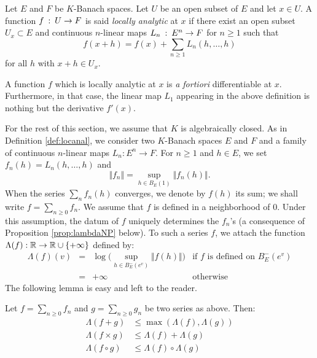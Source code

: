 \documentclass{lms}
\begin{document}
\begin{deftn}
\label{def:locanal}
Let $E$ and $F$ be $K$-Banach spaces. Let $U$ be an open subset of $E$
and let $x \in U$.
A function $f \: : \: U \rightarrow F$ is said \emph{locally analytic} at 
$x$ if there exist an open subset $U_x \subset E$ and continuous $n$-linear
maps $L_n \: : \: E^n \rightarrow F$ for $n \ge 1$ such that
\[
f(x+h) = f(x) + \sum_{n \geq 1} L_n(h,\ldots,h)
\]
for all $h$ with $x + h \in U_x$.
\end{deftn}

\begin{rmk}
A function $f$ which is locally analytic at $x$ is \emph{a fortiori} 
differentiable at $x$. Furthermore, in that case, the linear map $L_1$ 
appearing in the above definition is nothing but the derivative $f'(x)$.
\end{rmk}

For the rest of this section, we assume that $K$ is algebraically closed. As in Definition 
\ref{def:locanal}, we consider two $K$-Banach spaces $E$ and $F$ and a 
family of continuous $n$-linear maps $L_n : E^n \to F$. For $n \ge 1$ 
and $h \in E$, we set $f_n(h) = L_n(h, \ldots, h)$ and
$$\Vert f_n \Vert = \sup_{h \in B_E(1)} \Vert f_n(h) \Vert.$$
When the series $\sum_n f_n(h)$ converges, we denote by $f(h)$ its sum;
we shall write $f = \sum_{n \geq 0} f_n$. We assume that $f$ is defined
in a neighborhood of $0$. Under this assumption, the datum of $f$ 
uniquely determines the $f_n$'s (a consequence of Proposition 
\ref{prop:lambdaNP} below).
To such a series $f$, we attach the function $\Lambda(f) : \mathbb R \to \mathbb R 
\cup \{+\infty\}$ defined by:
$$\begin{array}{rcll}
\Lambda(f)(v) & = & 
\log \big( \sup_{h \in B^-_E(e^v)} \Vert f(h) \Vert \big)
& \text{if } f \text{ is defined on } B^-_E(e^v) \\
& = & +\infty & \text{otherwise}
\end{array}$$
The following lemma is easy and left to the reader.

\begin{lem}
\label{lem:opLambda}
Let $f = \sum_{n \geq 0} f_n$ and $g = \sum_{n \geq 0} g_n$ be two 
series as above. Then:
\begin{align*}
\Lambda(f+g) &\leq \max (\Lambda(f),\Lambda(g)) \\
\Lambda(f \times g) &\leq \Lambda(f)+\Lambda(g) \\
\Lambda(f \circ g) &\leq \Lambda(f) \circ \Lambda(g)
\end{align*}
\end{lem}
\end{document}
